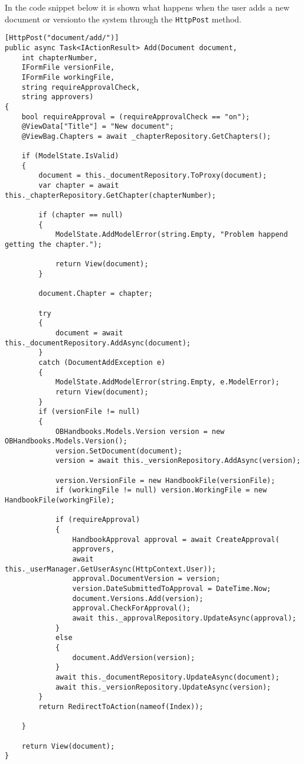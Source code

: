 In the code snippet below it is shown what happens when the user adds a new document or versionto the system through the \texttt{HttpPost} method.
\\
\begin{lstlisting}[caption={Document Controller: Add}, label={lst:doccontrolleradd}]
[HttpPost("document/add/")]
public async Task<IActionResult> Add(Document document,
	int chapterNumber,
	IFormFile versionFile,
	IFormFile workingFile,
	string requireApprovalCheck,
	string approvers)
{
	bool requireApproval = (requireApprovalCheck == "on");
	@ViewData["Title"] = "New document";
	@ViewBag.Chapters = await _chapterRepository.GetChapters();

	if (ModelState.IsValid)
	{
		document = this._documentRepository.ToProxy(document);
		var chapter = await this._chapterRepository.GetChapter(chapterNumber);

		if (chapter == null)
		{
			ModelState.AddModelError(string.Empty, "Problem happend getting the chapter.");

			return View(document);
		}

		document.Chapter = chapter;

		try
		{
			document = await this._documentRepository.AddAsync(document);
		}
		catch (DocumentAddException e)
		{
			ModelState.AddModelError(string.Empty, e.ModelError);
			return View(document);
		}
		if (versionFile != null)
		{
			OBHandbooks.Models.Version version = new OBHandbooks.Models.Version();
			version.SetDocument(document);
			version = await this._versionRepository.AddAsync(version);

			version.VersionFile = new HandbookFile(versionFile);
			if (workingFile != null) version.WorkingFile = new HandbookFile(workingFile);

			if (requireApproval)
			{
				HandbookApproval approval = await CreateApproval(
				approvers,
				await this._userManager.GetUserAsync(HttpContext.User));
				approval.DocumentVersion = version;
				version.DateSubmittedToApproval = DateTime.Now;
				document.Versions.Add(version);
				approval.CheckForApproval();
				await this._approvalRepository.UpdateAsync(approval);
			}
			else
			{
				document.AddVersion(version);
			}
			await this._documentRepository.UpdateAsync(document);
			await this._versionRepository.UpdateAsync(version);
		}
		return RedirectToAction(nameof(Index));

	}

	return View(document);
}
\end{lstlisting}

